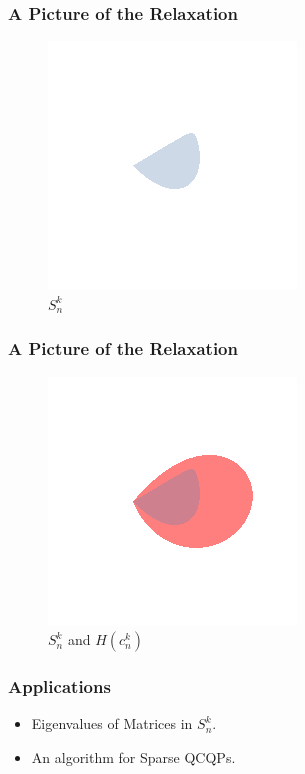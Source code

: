 \documentclass{beamer}
\begin{document}
\begin{frame}
    \frametitle{A Picture of the Relaxation}
    \begin{figure}[h]
        \centering
        \includegraphics[width=0.6\linewidth]{just_snk.png}
        \caption{$S^{k}_n$}%
        \label{fig:just_snk}
    \end{figure}
\end{frame}
\begin{frame}
    \frametitle{A Picture of the Relaxation}
    \begin{figure}[h]
        \centering
        \includegraphics[width=0.6\linewidth]{comparison.png}
        \caption{$S^{k}_n$ and $H(c^k_n)$}%
        \label{fig:just_snk}
    \end{figure}
\end{frame}
\begin{frame}
    \frametitle{Applications}
    \begin{itemize}
        \item Eigenvalues of Matrices in $S^k_n$.
        \item An algorithm for Sparse QCQPs.
    \end{itemize}
\end{frame}
\end{document}
